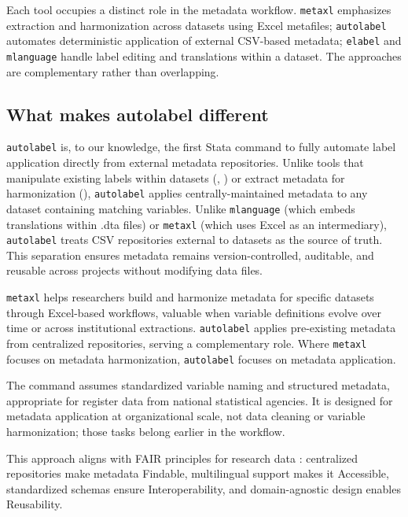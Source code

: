 \noindent Each tool occupies a distinct role in the metadata workflow. \texttt{metaxl} emphasizes extraction and harmonization across datasets using Excel metafiles; \texttt{autolabel} automates deterministic application of external CSV-based metadata; \texttt{elabel} and \texttt{mlanguage} handle label editing and translations within a dataset. The approaches are complementary rather than overlapping.

\subsection{What makes autolabel different}

\texttt{autolabel} is, to our knowledge, the first Stata command to fully automate label application directly from external metadata repositories. Unlike tools that manipulate existing labels within datasets (\citet{klein2019elabel}, \citet{weesie2005multilingual}) or extract metadata for harmonization (\citet{iglesias2025metaxl}), \texttt{autolabel} applies centrally-maintained metadata to any dataset containing matching variables. Unlike \texttt{mlanguage} (which embeds translations within .dta files) or \texttt{metaxl} (which uses Excel as an intermediary), \texttt{autolabel} treats CSV repositories external to datasets as the source of truth. This separation ensures metadata remains version-controlled, auditable, and reusable across projects without modifying data files.

\texttt{metaxl} helps researchers build and harmonize metadata for specific datasets through Excel-based workflows, valuable when variable definitions evolve over time or across institutional extractions. \texttt{autolabel} applies pre-existing metadata from centralized repositories, serving a complementary role. Where \texttt{metaxl} focuses on metadata harmonization, \texttt{autolabel} focuses on metadata application.

The command assumes standardized variable naming and structured metadata, appropriate for register data from national statistical agencies. It is designed for metadata application at organizational scale, not data cleaning or variable harmonization; those tasks belong earlier in the workflow.

This approach aligns with FAIR principles for research data \citep{wilkinson2016fair}: centralized repositories make metadata Findable, multilingual support makes it Accessible, standardized schemas ensure Interoperability, and domain-agnostic design enables Reusability.





